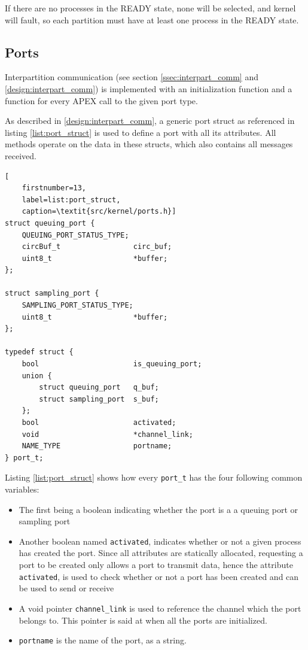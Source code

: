 If there are no processes in the READY state, none will be selected, and kernel
will fault, so each partition must have at least one process in the READY state.

\subsection{Ports}
\label{impl:ports}
Interpartition communication (see section \ref{ssec:interpart_comm} and \ref{design:interpart_comm})
is implemented with an initialization function and a function for every APEX call to the given port type.

As described in \ref{design:interpart_comm},
a generic port struct as referenced in listing \ref{list:port_struct} is used to define a port with all its attributes.
All methods operate on the data in these structs,
which also contains all messages received.

\begin{minipage}{\linewidth}
\begin{lstlisting}[
	firstnumber=13,
	label=list:port_struct,
	caption=\textit{src/kernel/ports.h}]
struct queuing_port {
    QUEUING_PORT_STATUS_TYPE;
    circBuf_t                 circ_buf;
    uint8_t                   *buffer;
};

struct sampling_port {
    SAMPLING_PORT_STATUS_TYPE;
    uint8_t                   *buffer;
};

typedef struct {
    bool                      is_queuing_port;
    union {
        struct queuing_port   q_buf;
        struct sampling_port  s_buf;
    };
    bool                      activated;
    void                      *channel_link;
    NAME_TYPE                 portname;
} port_t;
\end{lstlisting}
\end{minipage}

Listing \ref{list:port_struct} shows how every \texttt{port\_t} has the four following common variables:

\begin{itemize}
	\item The first being a boolean indicating whether the port is a a queuing port or sampling port
	\item Another boolean named \texttt{activated}, indicates whether or not a given process has created the port.
		Since all attributes are statically allocated, requesting a port to be created only allows a port to transmit data,
		hence the attribute \texttt{activated}, is used to check whether or not a port has been created and can be used to send or receive
	\item A void pointer \texttt{channel\_link} is used to reference the channel which the port belongs to.
		This pointer is said at when all the ports are initialized.
	\item \texttt{portname} is the name of the port, as a string.
\end{itemize}

